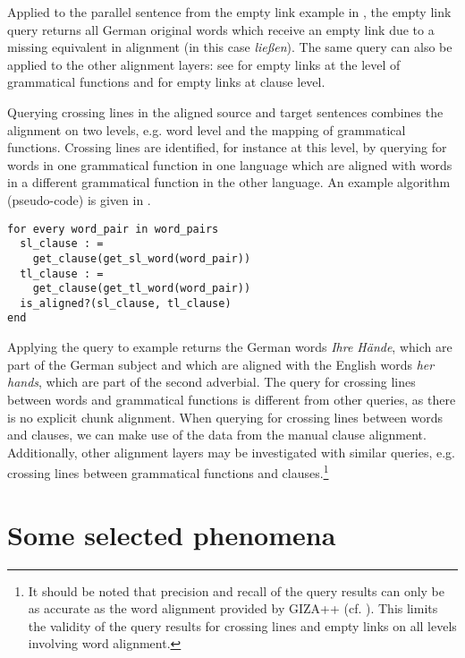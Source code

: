 \documentclass[output=paper]{LSP/langsci}
\begin{document}
Applied to the parallel sentence from the empty link example in , the empty link query returns all German original words which receive an empty link due to a missing equivalent in alignment (in this case \textit{ließen}). The same query can also be applied to the other alignment layers: see  for empty links at the level of grammatical functions and  for empty links at clause level.

Querying crossing lines in the aligned source and target sentences combines the alignment on two levels, e.g. word level and the mapping of grammatical functions. Crossing lines are identified, for instance at this level, by querying for words in one grammatical function in one language which are aligned with words in a different grammatical function in the other language. An example algorithm (pseudo-code) is given in .

\ea
\begin{lstlisting}
for every word_pair in word_pairs 
  sl_clause : = 
    get_clause(get_sl_word(word_pair)) 
  tl_clause : = 
    get_clause(get_tl_word(word_pair)) 
  is_aligned?(sl_clause, tl_clause) 
end 
\end{lstlisting}
\label{ex:culo:pseudocode}
\z

Applying the query to example  returns the German words \textit{Ihre Hände}, which are part of the German subject and which are aligned with the English words \textit{her hands}, which are part of the second adverbial. The query for crossing lines between words and grammatical functions is different from other queries, as there is no explicit chunk alignment. When querying for crossing lines between words and clauses, we can make use of the data from the manual clause alignment. Additionally, other alignment layers may be investigated with similar queries, e.g. crossing lines between grammatical functions and clauses.\footnote{It should be noted that precision and recall of the query results can only be as accurate as the word alignment provided by GIZA++ (cf. \citealt{CuloEtAl2008}). This limits the validity of the query results for crossing lines and empty links on all levels involving word alignment.}

\section{Some selected phenomena}\label{sec:culo:4}
\end{document}

